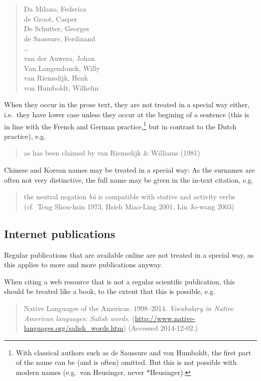 \documentclass[a4paper]{article}
\newenvironment{gsrexq}{\begin{quote}\color{blue}}{\end{quote}}
\begin{document}
\begin{gsrexq}
Da Milano, Federica \\
de Groot, Casper\\
De Schutter, Georges \\
de Saussure, Ferdinand\\
{\dots}\\
van der Auwera, Johan\\
Van Langendonck, Willy\\
van Riemsdijk, Henk\\
von Humboldt, Wilhelm\\
\end{gsrexq}

When they occur in the prose text, they are not
treated in a special way either, i.e.~they have lower case unless they
occur at the begining of a sentence (this is in line with the French and
German practice,\footnote{With
  classical authors such as de Saussure and von Humboldt, the first part of the name can be (and is often) omitted. But this is not possible with modern names (e.g.~von Heusinger, never *Heusinger).
}
but in contrast to the Dutch practice), e.g.
\begin{gsrexq}
as has been claimed by van Riemsdijk \& Williams (1981)
\end{gsrexq}
Chinese and Korean names may
be treated in a special way: As the surnames are often not very
distinctive, the full name may be given in the in-text citation,
e.g.

\begin{gsrexq}
the neutral negation \textit{bù} is compatible with stative and activity
verbs (cf.~Teng Shou-hsin 1973, Hsieh Miao-Ling 2001, Lin Jo-wang 2003)
\end{gsrexq}

\subsection{Internet publications}\label{sec:internet-publications}

Regular publications that are available online are not treated in a
special way, as this applies to more and more publications anyway. 

When citing a web resource that is not a regular scientific publication, this
should be treated like a book, to the extent that this is possible,
e.g.

\begin{gsrexq}
Native Languages of the Americas. 1998--2014. \textit{Vocabulary in Native American languages: Salish words.} (\url{http://www.native-languages.org/salish_words.htm}) (Accessed 2014-12-02.)
\end{gsrexq}
\end{document}
